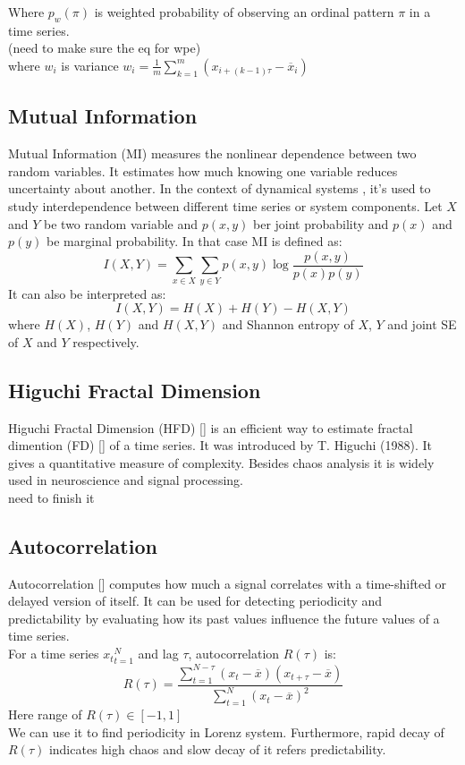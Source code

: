 \documentclass[%
 reprint,
 amsmath,amssymb,
 aps,
 floatfix,
]{revtex4-2}
\begin{document}
Where $p_w(\pi)$ is weighted probability of observing an ordinal pattern $\pi$ in a time series.\\
 (need to make sure the eq for wpe)\\
where $w_i$ is variance $w_i = \frac{1}{m} \sum_{k=1}^{m} (x_{i+(k-1)\tau} - \overline{x}_i) $
\subsection{Mutual Information}
Mutual Information (MI) measures the nonlinear dependence between two random variables. It estimates how much knowing one variable reduces uncertainty about another. In the context of dynamical systems , it's used to study interdependence between different time series or system components. Let $X$ and $Y$ be two random variable and $p(x,y)$ ber joint probability and $p(x)$ and $p(y)$ be marginal probability. In that case MI is defined as:
\begin{equation}
	I(X,Y) = \sum_{x\in X} \sum_{y\in Y} p(x,y) \log \frac{p(x,y)}{p(x)p(y)}
\end{equation}
It can also be interpreted as:
\begin{equation}
	I(X,Y) = H(X) + H(Y) - H(X,Y)
\end{equation}
where $H(X)$, $H(Y)$ and $H(X,Y)$ and Shannon entropy of $X$, $Y$ and joint SE of $X$ and $Y$ respectively.
\subsection{Higuchi Fractal Dimension}
Higuchi Fractal Dimension (HFD) [] is an efficient way to estimate fractal dimention (FD) [] of a time series. It was introduced by T. Higuchi (1988). It gives a quantitative measure of complexity. Besides chaos analysis it is widely used in neuroscience and signal processing.\\
need to finish it
\subsection{Autocorrelation}
Autocorrelation [] computes how much a signal correlates with a time-shifted or delayed version of  itself. It can be used for detecting periodicity and predictability by evaluating how its past values influence the future values of a time series.\\
For a time series ${x_t}_{t=1}^N$ and lag $\tau$, autocorrelation $R(\tau)$ is:
\begin{equation}
	R(\tau) = \frac{\sum_{t=1}^{N-\tau} (x_t - \overline{x}) (x_{t+\tau} - \overline{x})}{\sum_{t=1}^{N} (x_t - \overline{x})^2}
\end{equation}
Here range of $R(\tau) \in [-1,1]$ \\
We can use it to find periodicity in Lorenz system. Furthermore, rapid decay of $R(\tau)$ indicates high chaos and slow decay of it refers predictability.
\end{document}
